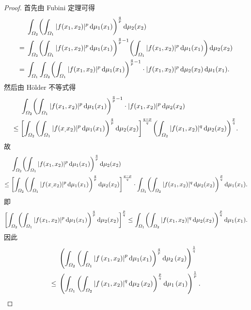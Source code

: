 \begin{proof}
    首先由 Fubini 定理可得
    \begin{align*}
        & \int_{\varOmega_2}\biggl(\int_{\varOmega_1}|f(x_1,x_2)|^p\diff\mu_1(x_1)\biggr)^{\frac{q}{p}}\diff\mu_2(x_2) \\
    ={} & \int_{\varOmega_2}\biggl(\int_{\varOmega_1}|f(x_1,x_2)|^p\diff\mu_1(x_1)\biggr)^{\frac{q}{p}-1}\biggl(\int_{\varOmega_1}|f(x_1,x_2)|^p\diff\mu_1(x_1)\biggr)\diff\mu_2(x_2) \\
    ={} & \int_{\varOmega_1}\int_{\varOmega_2}\biggl(\int_{\varOmega_1}|f(x_1,x_2)|^p\diff\mu_1(x_1)\biggr)^{\frac{q}{p}-1}\cdot |f(x_1,x_2)|^p\diff\mu_2(x_2)\diff\mu_1(x_1).
    \end{align*}
    然后由 H\"older 不等式得
    \begin{align*}
        & \int_{\varOmega_2}\biggl(\int_{\varOmega_1}|f(x_1,x_2)|^p\mathop{}\!\mathrm{d}\mu_1(x_1)\biggr)^{\frac{q}{p}-1}\cdot |f(x_1,x_2)|^p\mathop{}\!\mathrm{d}\mu_2(x_2) \\
    \leq{} & \biggl[\int_{\varOmega_2}\biggl(\int_{\varOmega_1}|f(x_,x_2)|^p\mathop{}\!\mathrm{d}\mu_1(x_1)\biggr)^{\frac{q}{p}}\mathop{}\!\mathrm{d}\mu_2(x_2)\biggr]^{\frac{q-p}{q}}\biggl(\int_{\varOmega_2}|f(x_1,x_2)|^q\mathop{}\!\mathrm{d}\mu_2(x_2)\biggr)^{\frac{p}{q}}.
    \end{align*}
    故
    \begin{align*}
        & \int_{\varOmega_2}\biggl(\int_{\varOmega_1}|f(x_1,x_2)|^p\mathop{}\!\mathrm{d}\mu_1(x_1)\biggr)^{\frac{q}{p}}\mathop{}\!\mathrm{d}\mu_2(x_2) \\
    \leq{} & \biggl[\int_{\varOmega_2}\biggl(\int_{\varOmega_1}|f(x_,x_2)|^p\mathop{}\!\mathrm{d}\mu_1(x_1)\biggr)^{\frac{q}{p}}\mathop{}\!\mathrm{d}\mu_2(x_2)\biggr]^{\frac{q-p}{q}}\cdot\int_{\varOmega_1}\biggl(\int_{\varOmega_2}|f(x_1,x_2)|^q\mathop{}\!\mathrm{d}\mu_2(x_2)\biggr)^{\frac{p}{q}}\mathop{}\!\mathrm{d}\mu_1(x_1).
    \end{align*}
    即
    \[\biggl[\int_{\varOmega_2}\biggl(\int_{\varOmega_1}|f(x_1,x_2)|^p\mathop{}\!\mathrm{d}\mu_1(x_1)\biggr)^{\frac{q}{p}}\mathop{}\!\mathrm{d}\mu_2(x_2)\biggr]^{\frac{p}{q}}\leq\int_{\varOmega_1}\biggl(\int_{\varOmega_2}|f(x_1,x_2)|^q\mathop{}\!\mathrm{d}\mu_2(x_2)\biggr)^{\frac{p}{q}}\mathop{}\!\mathrm{d}\mu_1(x_1).\]
    因此
    \begin{align*}
        & \left(\int_{\varOmega_{2}}\left(\int_{\varOmega_{1}}\left|f\left(x_{1}, x_{2}\right)\right|^{p}\mathop{}\!\mathrm{d}\mu_{1}(x_{1})\right)^{\frac{q}{p}}\mathop{}\!\mathrm{d} \mu_{2}\left(x_{2}\right)\right)^{\frac{1}{q}} \\
    \leq{} & \left(\int_{\varOmega_{1}}\left(\int_{\varOmega_{2}}\left|f\left(x_{1}, x_{2}\right)\right|^{q}\mathop{}\!\mathrm{d}\mu_{2}\left(x_{2}\right)\right)^{\frac{p}{q}}\mathop{}\!\mathrm{d}\mu_{1}\left(x_{1}\right)\right)^{\frac{1}{p}}.\qedhere
    \end{align*}
\end{proof}



